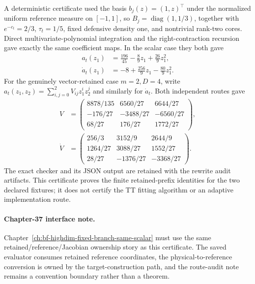 A deterministic certificate used the basis \(b_j(z)=(1,z)^\top\) under the
normalized uniform reference measure on \([-1,1]\), so
\(B_j=\operatorname{diag}(1,1/3)\), together with \(e^{-c_t}=2/3\),
\(\tau_t=1/5\), fixed defensive density one, and nontrivial rank-two cores.
Direct multivariate-polynomial integration and the right-contraction recursion
gave exactly the same coefficient maps.  In the scalar case they both gave
\begin{equation}
\begin{aligned}
  a_t(z_1)&=\frac{196}{45}-\frac89z_1+\frac{26}{9}z_1^2,\\
  \dot a_t(z_1)&=-8+\frac{256}{9}z_1-\frac{80}{9}z_1^2.
\end{aligned}
  \label{eq:bf-hd-squared-tt-scalar-exact-certificate}
\end{equation}
For the genuinely vector-retained case \(m=2,D=4\), write
\(a_t(z_1,z_2)=\sum_{i,j=0}^2V_{ij}z_1^iz_2^j\) and similarly for
\(\dot a_t\).  Both independent routes gave
\begin{equation}
\begin{aligned}
  V&=
  \begin{pmatrix}
  8878/135&6560/27&6644/27\\
  -176/27&-3488/27&-6560/27\\
  68/27&176/27&1772/27
  \end{pmatrix},\\[1mm]
  \dot V&=
  \begin{pmatrix}
  256/3&3152/9&2644/9\\
  1264/27&3088/27&1552/27\\
  28/27&-1376/27&-3368/27
  \end{pmatrix}.
\end{aligned}
  \label{eq:bf-hd-squared-tt-vector-exact-certificate}
\end{equation}
The exact checker and its JSON output are retained with the rewrite audit
artifacts.  This certificate proves the finite retained-prefix identities for
the two declared fixtures; it does not certify the TT fitting algorithm or an
adaptive implementation route.

\paragraph{Chapter-37 interface note.}
Chapter~\ref{ch:bf-highdim-fixed-branch-same-scalar} must use the same
retained/reference/Jacobian ownership story as this certificate.  The saved
evaluator consumes retained reference coordinates, the physical-to-reference
conversion is owned by the target-construction path, and the route-audit note
remains a convention boundary rather than a theorem.

